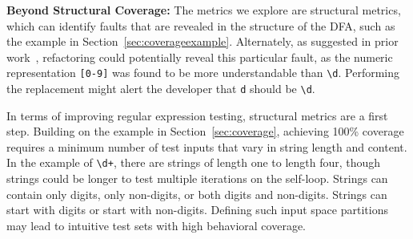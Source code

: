 \textbf{Beyond Structural Coverage: } 
The metrics we explore are structural metrics, which can identify faults that are revealed in the structure of the DFA, such as the example in Section~\ref{sec:coverageexample}. 
Alternately, as suggested in prior work~\cite{chapman2017exploring}, refactoring could potentially reveal this particular fault, as the numeric representation \verb![0-9]! was found to be more understandable than \verb!\d!. Performing the replacement might alert the developer that \verb!d! should be \verb!\d!. 

In terms of improving regular expression testing, structural metrics are a first step. 
Building on the example in Section~\ref{sec:coverage}, achieving 100\% coverage requires a minimum number of test inputs that vary in string length and content. 
In the example of {\tt \textbackslash d+}, there are strings of length one to length four, though strings could be longer to test multiple iterations on the self-loop. Strings can contain only digits, only non-digits, or both digits and non-digits. Strings can start with digits or start with non-digits. %
Defining such input space partitions may lead to intuitive test sets with high behavioral coverage. 



